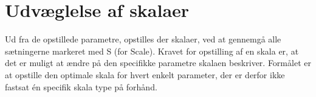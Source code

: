\section{Udvæglelse af skalaer}
\label{ParametreDatabehandlingSkalaer}
%


Ud fra de opstillede parametre, opstilles der skalaer, ved at gennemgå alle sætningerne markeret med S (for Scale). Kravet for opstilling af en skala er, at det er muligt at ændre på den specifikke parametre skalaen beskriver. Formålet er at opstille den optimale skala for hvert enkelt parameter, der er derfor ikke fastsat én specifik skala type på forhånd. 








